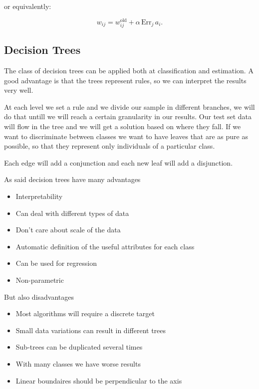 or equivalently:

\[
w_{ij} = w_{ij}^{\text{old}} + \alpha\, \mathrm{Err}_j \, a_i.
\]


\subsection{Decision Trees}

The class of decision trees can be applied both at classification and estimation. A good advantage is that the trees represent rules, so we can interpret the results very well. 

\vspace{10pt}

At each level we set a rule and we divide our sample in different branches, we will do that untill we will reach a certain granularity in our results. Our test set data will flow in the tree and we will get a solution based on where they fall. If we want to discriminate between classes we want to have leaves that are as pure as possible, so that they represent only individuals of a particular class. 

Each edge will add a conjunction and each new leaf will add a disjunction.

\vspace{10pt}

As said decision trees have many advantages

\begin{itemize}
    \item Interpretability
    \item Can deal with different types of data
    \item Don't care about scale of the data
    \item Automatic definition of the useful attributes for each class
    \item Can be used for regression
    \item Non-parametric
\end{itemize}

But also disadvantages

\begin{itemize}
    \item Most algorithms will require a discrete target
    \item Small data variations can result in different trees
    \item Sub-trees can be duplicated several times
    \item With many classes we have worse results
    \item Linear boundaires should be perpendicular to the axis
\end{itemize}


